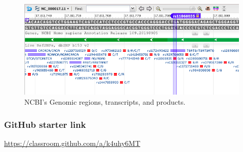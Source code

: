 

\long{}
\usepackage{hyperref} 
\hypersetup{ colorlinks=true, linkcolor=blue, filecolor=magenta, urlcolor=red, }




\begin{figure}[ht!]
	\begin{center}
	 \includegraphics[scale=.5]{graphics/snps.png}
	\end{center}
	\caption{NCBI's Genomic regions, transcripts, and products.}
	\label{fig:ncbi}
\end{figure}


\subsubsection*{GitHub starter link}
\begin{center}
\color{red} \url{https://classroom.github.com/a/k4uhy6MT} \color{black}
\end{center}




